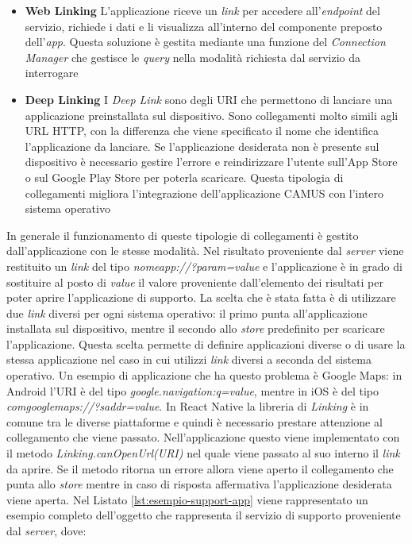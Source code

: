 \begin{itemize}
	\item \textbf{Web Linking}
	L'applicazione riceve un \emph{link} per accedere all'\emph{endpoint} del servizio, richiede i dati e li visualizza all'interno del componente preposto dell'\emph{app}. Questa soluzione è gestita mediante una funzione del \emph{Connection Manager} che gestisce le \emph{query} nella modalità richiesta dal servizio da interrogare
	\item \textbf{Deep Linking}
	I \emph{Deep Link} sono degli URI che permettono di lanciare una applicazione preinstallata sul dispositivo. Sono collegamenti molto simili agli URL HTTP, con la differenza che viene specificato il nome che identifica l'applicazione da lanciare. Se l'applicazione desiderata non è presente sul dispositivo è necessario gestire l'errore e reindirizzare l'utente sull'App Store o sul Google Play Store per poterla scaricare. Questa tipologia di collegamenti migliora l'integrazione dell'applicazione CAMUS con l'intero sistema operativo
\end{itemize}
	 
In generale il funzionamento di queste tipologie di collegamenti è gestito dall'ap\-pli\-ca\-zio\-ne con le stesse modalità. Nel risultato proveniente dal \emph{server} viene restituito un \emph{link} del tipo \emph{nomeapp://?param={value}} e l'applicazione è in grado di sostituire al posto di \emph{value} il valore proveniente dall'elemento dei risultati per poter aprire l'applicazione di supporto. La scelta che è stata fatta è di utilizzare due \emph{link} diversi per ogni sistema operativo: il primo punta all'applicazione installata sul dispositivo, mentre il secondo allo \emph{store} predefinito per scaricare l'applicazione. Questa scelta permette di definire applicazioni diverse o di usare la stessa applicazione nel caso in cui utilizzi \emph{link} diversi a seconda del sistema operativo. Un esempio di applicazione che ha questo problema è Google Maps: in Android l'URI è del tipo \emph{google.navigation:q={value}}, mentre in iOS è del tipo \emph{comgooglemaps://?saddr={value}}. In React Native la libreria di \emph{Linking} è in comune tra le diverse piattaforme e quindi è necessario prestare attenzione al collegamento che viene passato. Nell'applicazione questo viene implementato con il metodo \emph{Linking.canOpenUrl(URI)} nel quale viene passato al suo interno il \emph{link} da aprire. Se il metodo ritorna un errore allora viene aperto il collegamento che punta allo \emph{store} mentre in caso di risposta affermativa l'applicazione desiderata viene aperta. Nel Listato \ref{lst:esempio-support-app} viene rappresentato un esempio completo dell'oggetto che rappresenta il servizio di supporto proveniente dal \emph{server}, dove:

